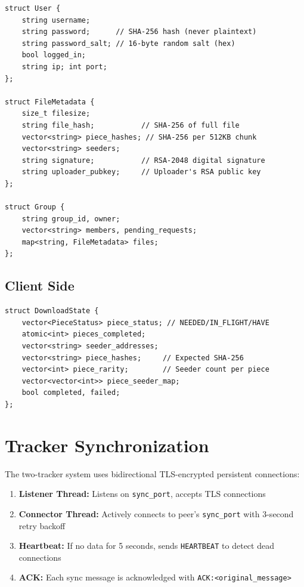 \documentclass[12pt,a4paper]{article}
\begin{document}
\begin{lstlisting}[caption={Core Data Structures (Tracker)}]
struct User {
    string username;
    string password;      // SHA-256 hash (never plaintext)
    string password_salt; // 16-byte random salt (hex)
    bool logged_in;
    string ip; int port;
};

struct FileMetadata {
    size_t filesize;
    string file_hash;           // SHA-256 of full file
    vector<string> piece_hashes; // SHA-256 per 512KB chunk
    vector<string> seeders;
    string signature;           // RSA-2048 digital signature
    string uploader_pubkey;     // Uploader's RSA public key
};

struct Group {
    string group_id, owner;
    vector<string> members, pending_requests;
    map<string, FileMetadata> files;
};
\end{lstlisting}

\subsection{Client Side}

\begin{lstlisting}[caption={Download State (Client)}]
struct DownloadState {
    vector<PieceStatus> piece_status; // NEEDED/IN_FLIGHT/HAVE
    atomic<int> pieces_completed;
    vector<string> seeder_addresses;
    vector<string> piece_hashes;     // Expected SHA-256
    vector<int> piece_rarity;        // Seeder count per piece
    vector<vector<int>> piece_seeder_map;
    bool completed, failed;
};
\end{lstlisting}

\section{Tracker Synchronization}

The two-tracker system uses bidirectional TLS-encrypted persistent connections:

\begin{enumerate}
    \item \textbf{Listener Thread:} Listens on \texttt{sync\_port}, accepts TLS connections
    \item \textbf{Connector Thread:} Actively connects to peer's \texttt{sync\_port} with 3-second retry backoff
    \item \textbf{Heartbeat:} If no data for 5 seconds, sends \texttt{HEARTBEAT} to detect dead connections
    \item \textbf{ACK:} Each sync message is acknowledged with \texttt{ACK:<original\_message>}
\end{enumerate}
\end{document}
